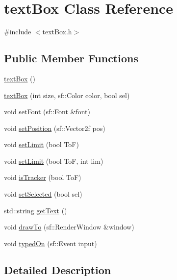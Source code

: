 \hypertarget{classtext_box}{}\section{text\+Box Class Reference}
\label{classtext_box}


{\ttfamily \#include $<$text\+Box.\+h$>$}

\subsection*{Public Member Functions}
\begin{DoxyCompactItemize}
\item 
\mbox{\hyperlink{classtext_box_ae2978707ad54e9a02106694370acfe6f}{text\+Box}} ()
\item 
\mbox{\hyperlink{classtext_box_a5a70337146669e9bfadb15d16f67db37}{text\+Box}} (int size, sf\+::\+Color color, bool sel)
\item 
void \mbox{\hyperlink{classtext_box_a390fb8374ec6fec5dc3a71e9a4257553}{set\+Font}} (sf\+::\+Font \&font)
\item 
void \mbox{\hyperlink{classtext_box_ae2103e20eb1adeb3bb5a29cc50b511b9}{set\+Position}} (sf\+::\+Vector2f pos)
\item 
void \mbox{\hyperlink{classtext_box_a481f81251c418b55fe78e230fcc1bc75}{set\+Limit}} (bool ToF)
\item 
void \mbox{\hyperlink{classtext_box_adbcf45bbab4faadc172e419da752484b}{set\+Limit}} (bool ToF, int lim)
\item 
void \mbox{\hyperlink{classtext_box_a9b5a0f5e721811f899659436ff5707d0}{is\+Tracker}} (bool ToF)
\item 
void \mbox{\hyperlink{classtext_box_ad119049c6dae381322ba4ff22d9eda42}{set\+Selected}} (bool sel)
\item 
std\+::string \mbox{\hyperlink{classtext_box_a71136cb45321e5620ef8ab9e1ace7348}{get\+Text}} ()
\item 
void \mbox{\hyperlink{classtext_box_a27b3756c0fabe55db09145a30adb793e}{draw\+To}} (sf\+::\+Render\+Window \&window)
\item 
void \mbox{\hyperlink{classtext_box_a6ffbf16c973f4a49fed5661813ae9cce}{typed\+On}} (sf\+::\+Event input)
\end{DoxyCompactItemize}


\subsection{Detailed Description}


